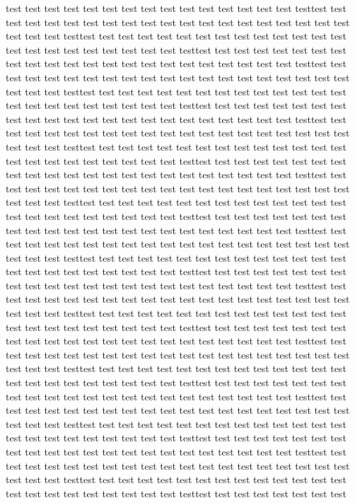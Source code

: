 test test test test test test test test test test test test test test test testtest test test test test test test test
test test test test test test test test test test test test test test test testtest test test test test test test test
test test test test test test test test test test test test test test test testtest test test test test test test test
test test test test test test test test test test test test test test test testtest test test test test test test test
test test test test test test test test test test test test test test test testtest test test test test test test test
test test test test test test test test test test test test test test test testtest test test test test test test test
test test test test test test test test test test test test test test test testtest test test test test test test test
test test test test test test test test test test test test test test test testtest test test test test test test test
test test test test test test test test test test test test test test test testtest test test test test test test test
test test test test test test test test test test test test test test test testtest test test test test test test test
test test test test test test test test test test test test test test test testtest test test test test test test test
test test test test test test test test test test test test test test test testtest test test test test test test test
test test test test test test test test test test test test test test test testtest test test test test test test test
test test test test test test test test test test test test test test test testtest test test test test test test test
test test test test test test test test test test test test test test test testtest test test test test test test test
test test test test test test test test test test test test test test test testtest test test test test test test test
test test test test test test test test test test test test test test test testtest test test test test test test test
test test test test test test test test test test test test test test test testtest test test test test test test test
test test test test test test test test test test test test test test test testtest test test test test test test test
test test test test test test test test test test test test test test test testtest test test test test test test test
test test test test test test test test test test test test test test test testtest test test test test test test test
test test test test test test test test test test test test test test test testtest test test test test test test test
test test test test test test test test test test test test test test test testtest test test test test test test test
test test test test test test test test test test test test test test test testtest test test test test test test test
test test test test test test test test test test test test test test test testtest test test test test test test test
test test test test test test test test test test test test test test test testtest test test test test test test test
test test test test test test test test test test test test test test test testtest test test test test test test test


